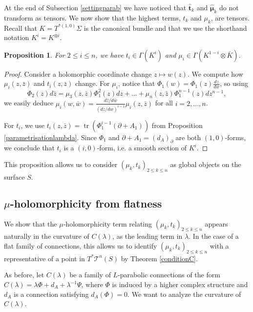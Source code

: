 \documentclass[11pt]{amsart}
\newtheorem{prop}[thm]{Proposition}
\numberwithin{thm}{section} %
\numberwithin{equation}{section} %
\numberwithin{figure}{section} %
\renewcommand*{\S}{S}
\renewcommand*{\l}{\lambda}
\newcommand*{\mc}{\mathcal}
\newcommand*{\cotang}{T^*\mc{T}^n(S)}
\DeclareMathOperator{\tr}{tr}
\begin{document}
At the end of Subsection \ref{settingparab} we have noticed that $\bm\hat{t}_k$ and $\bm\hat{\mu}_k$ do not transform as tensors. We now show that the highest terms, $t_k$ and $\mu_k$, are tensors. Recall that $K=T^{*(1,0)}\Sigma$ is the canonical bundle and that we use the shorthand notation $K^i=K^{\otimes i}$.
\begin{prop}\label{highesttermtensor}
For $2\leq i\leq n$, we have $t_i \in \Gamma(K^i)$ and $\mu_i \in \Gamma(K^{1-i}\otimes \bar{K})$.
\end{prop}
\begin{proof}
Consider a holomorphic coordinate change $z\mapsto w(z)$. We compute how $\mu_i(z,\bar{z})$ and $t_i(z,\bar{z})$ change. 
For $\mu_i$, notice that $\Phi_1(w) = \Phi_1(z) \frac{dz}{dw}$, so using $$\Phi_2(z)d\bar{z} = \mu_3(z,\bar{z})\Phi_1^2(z)dz+...+\mu_n(z,\bar{z})\Phi_1^{n-1}(z)dz^{n-1},$$ we easily deduce $\mu_i(w,\bar{w})=\frac{d\bar{z}/d\bar{w}}{(dz/dw)^{i-1}}\mu_i(z,\bar{z})$ for all $i=2,...,n$.

For $t_i$, we use $t_i(z,\bar{z})=\tr(\Phi_1^{i-1}(\partial+A_1))$ from Proposition \ref{parametrisationlambda}. Since $\Phi_1$ and $\partial+A_1=(d_A)_{\partial}$ are both $(1,0)$-forms, we conclude that $t_i$ is a $(i,0)$-form, i.e. a smooth section of $K^i$.
\end{proof}
This proposition allows us to consider $(\mu_k, t_k)_{2\leq k\leq n}$ as global objects on the surface $\S$.


\subsection{$\mu$-holomorphicity from flatness}

We show that the $\mu$-holomorphicity term relating $(\mu_k, t_k)_{2\leq k\leq n}$ appears naturally in the curvature of $C(\l)$, as the leading term in $\l$. In the case of a flat family of connections, this allows us to identify $(\mu_k, t_k)_{2\leq k\leq n}$ with a representative of a point in $\cotang$ by Theorem \ref{conditionC}.

\medskip
As before, let $C(\l)$ be a family of $L$-parabolic connections of the form $C(\l)=\l\Phi+d_A+\l^{-1}\Psi$, where $\Phi$ is induced by a higher complex structure and $d_A$ is a connection satisfying $d_A(\Phi)=0$. We want to analyze the curvature of $C(\l)$.
\end{document}

